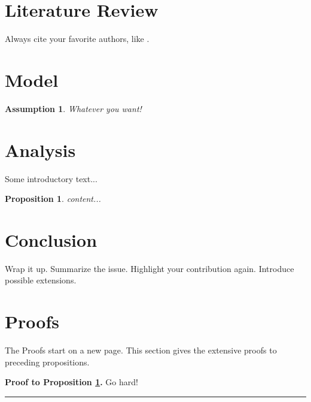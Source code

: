\documentclass[
	12pt, %
	a4paper, %
	]{article}
\theoremstyle{break} %
\newtheorem{assumption}{Assumption}
\newtheorem{proposition}{Proposition}
\newenvironment{proof}[1][Proof]{\noindent\textbf{#1.}}{\ \rule{0.5em}{0.5em}}
\begin{document}
\section{Literature Review} \label{sec:literature}
Always cite your favorite authors, like \cite{gersbach2017regulation}.

\section{Model} \label{sec:model}
\begin{assumption}
	Whatever you want!
\end{assumption}

\section{Analysis} \label{sec:analysis}
Some introductory text...
\begin{proposition}\label{prop:label}
	content...
\end{proposition}

\section{Conclusion} \label{sec:conclusion}
Wrap it up.
Summarize the issue.
Highlight your contribution again.
Introduce possible extensions.

\singlespacing




\clearpage

\doublespacing
\appendix
\section{Proofs} \label{app:proofs}
The Proofs start on a new page.
This section gives the extensive proofs to preceding propositions.

\begin{proof}[Proof to Proposition \ref{prop:label}]
	Go hard!
\end{proof}
\end{document}
